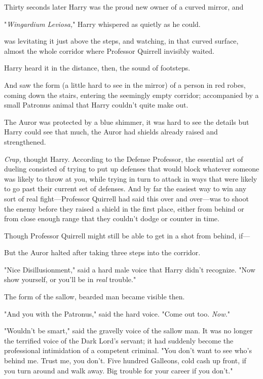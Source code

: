 Thirty seconds later Harry was the proud new owner of a curved mirror,
and{\el}

"\emph{Wingardium Leviosa,}" Harry whispered as quietly as he could.

{\el} was levitating it just above the steps, and watching, in that curved
surface, almost the whole corridor where Professor Quirrell invisibly waited.

Harry heard it in the distance, then, the sound of footsteps.

And saw the form (a little hard to see in the mirror) of a person in red robes,
coming down the stairs, entering the seemingly empty corridor; accompanied by a
small Patronus animal that Harry couldn't quite make out.

The Auror was protected by a blue shimmer, it was hard to see the details but
Harry could see that much, the Auror had shields already raised and
strengthened.

\emph{Crap,} thought Harry. According to the Defense Professor, the essential
art of dueling consisted of trying to put up defenses that would block whatever
someone was likely to throw at you, while trying in turn to attack in ways that
were likely to go past their current set of defenses. And by far the easiest
way to win any sort of real fight---Professor Quirrell had said this over and
over---was to shoot the enemy before they raised a shield in the first place,
either from behind or from close enough range that they couldn't dodge or
counter in time.

Though Professor Quirrell might still be able to get in a shot from behind,
if---

But the Auror halted after taking three steps into the corridor.

"Nice Disillusionment," said a hard male voice that Harry didn't recognize.
"Now show yourself, or you'll be in \emph{real} trouble."

The form of the sallow, bearded man became visible then.

"And you with the Patronus," said the hard voice. "Come out too. \emph{Now.}"

"Wouldn't be smart," said the gravelly voice of the sallow man. It was no
longer the terrified voice of the Dark Lord's servant; it had suddenly become
the professional intimidation of a competent criminal. "You don't want to see
who's behind me. Trust me, you don't. Five hundred Galleons, cold cash up
front, if you turn around and walk away. Big trouble for your career if you
don't."

